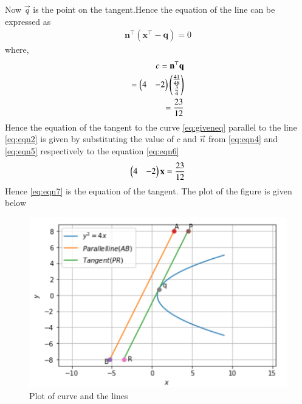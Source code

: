 \documentclass[journal,12pt,twocolumn]{IEEEtran}
\begin{document}
Now $\vec{q}$ is the point on the tangent.Hence the equation of the line can be expressed as 
\begin{align}
    \mathbf{n}^{\top}(\mathbf{x}^{\top}-\mathbf{q}) = 0\label{eq:eqn6}
\end{align}
where,
\begin{align}
    c=\mathbf{n}^{\top}\mathbf{q}
    \\
    =\begin{pmatrix}4&-2\end{pmatrix}\begin{pmatrix}\frac{41}{48} \\ \frac{3}{4}\end{pmatrix} 
    \\
    = \frac{23}{12} \label{eq:eqn4}
\end{align}
Hence the equation of the tangent to the curve \eqref{eq:giveneq} parallel to the line \eqref{eq:eqn2} is given by substituting the value of $c$ and $\vec{n}$ from \eqref{eq:eqn4} and \eqref{eq:eqn5} respectively to the equation \eqref{eq:eqn6} 
\begin{align}
    \begin{pmatrix}4&-2\end{pmatrix}\mathbf{x}=\frac{23}{12} \label{eq:eqn7}
\end{align}
Hence \eqref{eq:eqn7} is the equation of the tangent.
The plot of the figure is given below

\begin{figure}[ht]
\centering
\includegraphics[width=\columnwidth]{Parabola.PNG}
\caption{Plot of curve and the lines}
\label{Plot of curve and the lines}
\end{figure}
\end{document}
